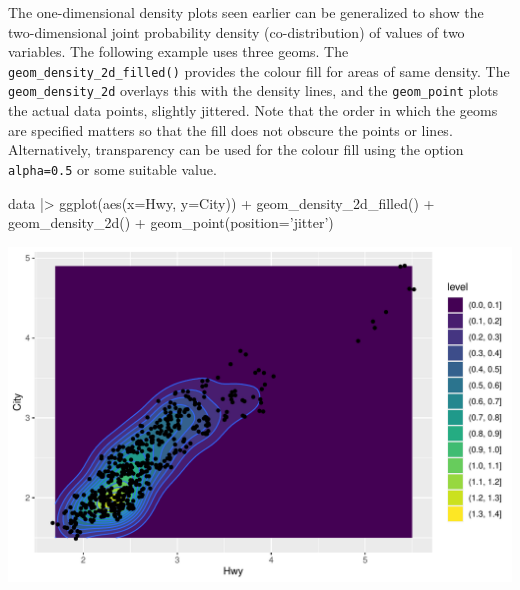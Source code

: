 





The one-dimensional density plots seen earlier can be generalized to show the two-dimensional joint probability density (co-distribution) of values of two variables. The following example uses three geoms. The \texttt{geom\_density\_2d\_filled()} provides the colour fill for areas of same density. The \texttt{geom\_density\_2d} overlays this with the density lines, and the \texttt{geom\_point} plots the actual data points, slightly jittered. Note that the order in which the geoms are specified matters so that the fill does not obscure the points or lines. Alternatively, transparency can be used for the colour fill using the option \texttt{alpha=0.5} or some suitable value.

\begin{Rcode}
data |>
  ggplot(aes(x=Hwy, y=City)) + 
    geom_density_2d_filled() + 
    geom_density_2d() +
    geom_point(position='jitter')
\end{Rcode}

\begin{center}
  \includegraphics[width=.8\textwidth]{fuel.density2d.pdf}
\end{center}

